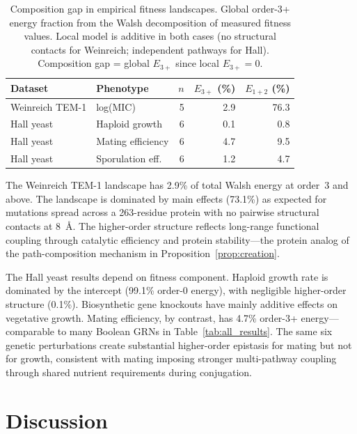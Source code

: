 \documentclass[10pt]{article}
\begin{document}
\begin{table}[t]
\centering
\caption{Composition gap in empirical fitness landscapes. Global
order-3+ energy fraction from the Walsh decomposition of measured
fitness values. Local model is additive in both cases (no structural
contacts for Weinreich; independent pathways for Hall). Composition
gap = global $E_{3+}$ since local $E_{3+} = 0$.}
\label{tab:empirical}
\begin{tabular}{llrrr}
\toprule
Dataset & Phenotype & $n$ & $E_{3+}$ (\%) & $E_{1+2}$ (\%) \\
\midrule
Weinreich TEM-1 & log(MIC) & 5 & 2.9 & 76.3 \\
Hall yeast & Haploid growth & 6 & 0.1 & 0.8 \\
Hall yeast & Mating efficiency & 6 & 4.7 & 9.5 \\
Hall yeast & Sporulation eff. & 6 & 1.2 & 4.7 \\
\bottomrule
\end{tabular}
\end{table}

The Weinreich TEM-1 landscape has 2.9\% of total Walsh energy at
order~3 and above. The landscape is dominated by main effects
(73.1\%) as expected for mutations spread across a 263-residue
protein with no pairwise structural contacts at 8~\AA. The
higher-order structure reflects long-range functional coupling
through catalytic efficiency and protein stability---the protein
analog of the path-composition mechanism in
Proposition~\ref{prop:creation}.

The Hall yeast results depend on fitness component. Haploid growth
rate is dominated by the intercept (99.1\% order-0 energy), with
negligible higher-order structure (0.1\%). Biosynthetic gene
knockouts have mainly additive effects on vegetative growth. Mating efficiency, by
contrast, has 4.7\% order-3+ energy---comparable to many Boolean
GRNs in Table~\ref{tab:all_results}. The same six genetic
perturbations create substantial higher-order epistasis for mating
but not for growth, consistent with mating imposing stronger
multi-pathway coupling through shared nutrient requirements during
conjugation.


\section{Discussion}
\label{sec:discussion}
\end{document}
